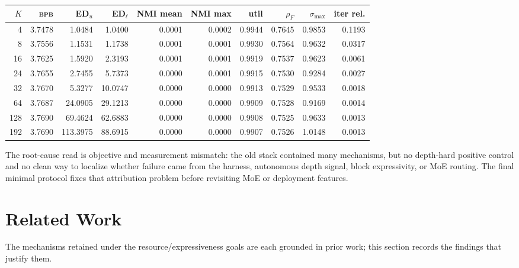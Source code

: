 \documentclass[11pt]{article}
\newcommand{\bpb}{\textsc{bpb}}
\begin{document}
\begin{center}
\scriptsize
\setlength{\tabcolsep}{4pt}
\renewcommand{\arraystretch}{1.10}
\begin{tabular}{@{}r r r r r r r r r r@{}}
\toprule
\(K\) & \bpb{} & ED$_u$ & ED$_\ell$ & NMI mean & NMI max & util & \(\rho_F\) & \(\sigma_{\max}\) & iter rel. \\
\midrule
4   & 3.7478 & 1.0484   & 1.0400  & 0.0001 & 0.0002 & 0.9944 & 0.7645 & 0.9853 & 0.1193 \\
8   & 3.7556 & 1.1531   & 1.1738  & 0.0001 & 0.0001 & 0.9930 & 0.7564 & 0.9632 & 0.0317 \\
16  & 3.7625 & 1.5920   & 2.3193  & 0.0001 & 0.0001 & 0.9919 & 0.7537 & 0.9623 & 0.0061 \\
24  & 3.7655 & 2.7455   & 5.7373  & 0.0000 & 0.0001 & 0.9915 & 0.7530 & 0.9284 & 0.0027 \\
32  & 3.7670 & 5.3277   & 10.0747 & 0.0000 & 0.0000 & 0.9913 & 0.7529 & 0.9533 & 0.0018 \\
64  & 3.7687 & 24.0905  & 29.1213 & 0.0000 & 0.0000 & 0.9909 & 0.7528 & 0.9169 & 0.0014 \\
128 & 3.7690 & 69.4624  & 62.6883 & 0.0000 & 0.0000 & 0.9908 & 0.7525 & 0.9633 & 0.0013 \\
192 & 3.7690 & 113.3975 & 88.6915 & 0.0000 & 0.0000 & 0.9907 & 0.7526 & 1.0148 & 0.0013 \\
\bottomrule
\end{tabular}
\end{center}

The root-cause read is objective and measurement mismatch: the old stack contained many mechanisms,
but no depth-hard positive control and no clean way to localize whether failure came from the
harness, autonomous depth signal, block expressivity, or MoE routing.  The final minimal protocol
fixes that attribution problem before revisiting MoE or deployment features.

\section{Related Work}
\label{sec:related}

The mechanisms retained under the resource/expressiveness goals are each grounded in prior
work; this section records the findings that justify them.
\end{document}
